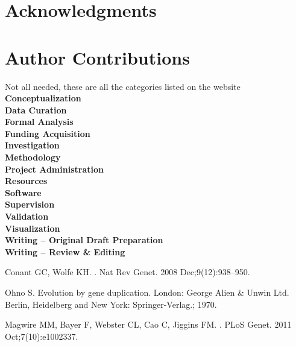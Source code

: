 \documentclass[10pt,letterpaper]{article}
\begin{document}
	\section*{Acknowledgments}
	
	
	\nolinenumbers
	
	\section*{Author Contributions}
	\textinterrobang Not all needed, these are all the categories listed on the website \\\noindent
	\textbf{Conceptualization} \\\noindent
	\textbf{Data Curation} \\\noindent
	\textbf{Formal Analysis} \\\noindent
	\textbf{Funding Acquisition} \\\noindent
	\textbf{Investigation} \\\noindent
	\textbf{Methodology} \\\noindent
	\textbf{Project Administration} \\\noindent
	\textbf{Resources} \\\noindent
	\textbf{Software} \\\noindent
	\textbf{Supervision} \\\noindent
	\textbf{Validation} \\\noindent
	\textbf{Visualization} \\\noindent
	\textbf{Writing – Original Draft Preparation} \\\noindent
	\textbf{Writing – Review \& Editing} \\\noindent
	
	
	\begin{thebibliography}{10}
		
		Conant GC, Wolfe KH.
		.
		\newblock Nat Rev Genet. 2008 Dec;9(12):938--950.
		
		Ohno S.
		\newblock Evolution by gene duplication.
		\newblock London: George Alien \& Unwin Ltd. Berlin, Heidelberg and New York:
		Springer-Verlag.; 1970.
		
		Magwire MM, Bayer F, Webster CL, Cao C, Jiggins FM.
		.
		\newblock PLoS Genet. 2011 Oct;7(10):e1002337.
		
	\end{thebibliography}
	
	
	
\end{document}
